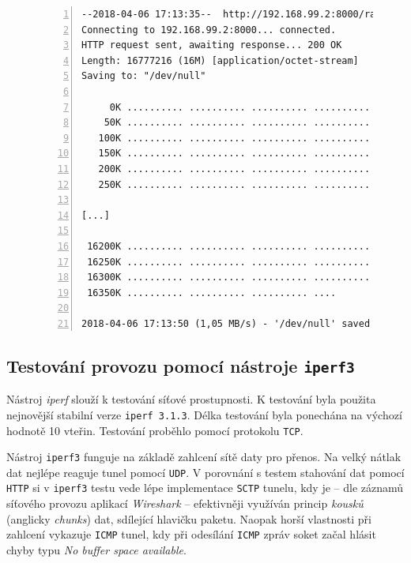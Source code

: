 \documentclass[thesis=M,czech]{FITthesis}[2012/10/20]
\begin{document}
    
    \begin{figure}[h]
	\begin{lstlisting}[label=code:wget,caption=Ukázkový výstup příkazu \texttt{wget},frame=single,numbers=left,linewidth=1.1\textwidth]
--2018-04-06 17:13:35--  http://192.168.99.2:8000/random.16
Connecting to 192.168.99.2:8000... connected.
HTTP request sent, awaiting response... 200 OK
Length: 16777216 (16M) [application/octet-stream]
Saving to: "/dev/null"

     0K .......... .......... .......... .......... ..........  0% 1,01K 17s
    50K .......... .......... .......... .......... ..........  0% 1,07M 16s
   100K .......... .......... .......... .......... ..........  0% 1,04M 15s
   150K .......... .......... .......... .......... ..........  1% 1,07M 15s
   200K .......... .......... .......... .......... ..........  1% 1,07M 15s
   250K .......... .......... .......... .......... ..........  1% 1,04M 15s

[...]

 16200K .......... .......... .......... .......... .......... 99% 1,07M 0s
 16250K .......... .......... .......... .......... .......... 99% 1,04M 0s
 16300K .......... .......... .......... .......... .......... 99% 1,07M 0s
 16350K .......... .......... .......... ....                         100% 1,04M=15s

2018-04-06 17:13:50 (1,05 MB/s) - '/dev/null' saved [16777216/16777216]
      \end{lstlisting}
    \end{figure}

\subsection{Testování provozu pomocí nástroje \texttt{iperf3}}
\label{test:iperf3}

Nástroj \textit{iperf} slouží k testování síťové prostupnosti. K testování byla použita nejnovější stabilní verze \texttt{iperf 3.1.3}. Délka testování byla ponechána na výchozí hodnotě 10 vteřin. Testování proběhlo pomocí protokolu \texttt{TCP}.

Nástroj \texttt{iperf3} funguje na základě zahlcení sítě daty pro přenos. Na velký nátlak dat nejlépe reaguje tunel pomocí \texttt{UDP}. V porovnání s testem stahování dat pomocí \texttt{HTTP} si v \texttt{iperf3} testu vede lépe implementace \texttt{SCTP} tunelu, kdy je -- dle záznamů síťového provozu aplikací \textit{Wireshark} -- efektivněji využíván princip \textit{kousků} (anglicky \textit{chunks}) dat, sdílející hlavičku paketu. Naopak horší vlastnosti při zahlcení vykazuje \texttt{ICMP} tunel, kdy při odesílání \texttt{ICMP} zpráv soket začal hlásit chyby typu \textit{No buffer space available}.
\end{document}
